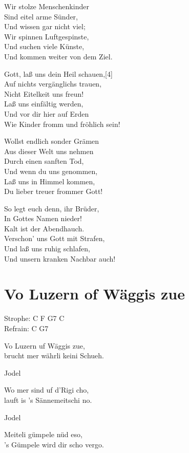 \documentclass[
  letterpaper,
]{scrbook}
\begin{document}
Wir stolze Menschenkinder\\
Sind eitel arme Sünder,\\
Und wissen gar nicht viel;\\
Wir spinnen Luftgespinste,\\
Und suchen viele Künste,\\
Und kommen weiter von dem Ziel.

Gott, laß uns dein Heil schauen,{[}4{]}\\
Auf nichts vergänglichs trauen,\\
Nicht Eitelkeit uns freun!\\
Laß uns einfältig werden,\\
Und vor dir hier auf Erden\\
Wie Kinder fromm und fröhlich sein!

Wollst endlich sonder Grämen\\
Aus dieser Welt uns nehmen\\
Durch einen sanften Tod,\\
Und wenn du uns genommen,\\
Laß uns in Himmel kommen,\\
Du lieber treuer frommer Gott!

So legt euch denn, ihr Brüder,\\
In Gottes Namen nieder!\\
Kalt ist der Abendhauch.\\
Verschon' uns Gott mit Strafen,\\
Und laß uns ruhig schlafen,\\
Und unsern kranken Nachbar auch!

\hypertarget{vo-luzern-of-wuxe4ggis-zue}{%
\chapter{Vo Luzern of Wäggis zue}\label{vo-luzern-of-wuxe4ggis-zue}}

Strophe: C F G7 C\\
Refrain: C G7

Vo Luzern uf Wäggis zue,\\
brucht mer währli keini Schueh.

Jodel

Wo mer sind uf d'Rigi cho,\\
lauft is 's Sännemeitschi no.

Jodel

Meiteli gümpele nüd eso,\\
's Gümpele wird dir scho vergo.
\end{document}
